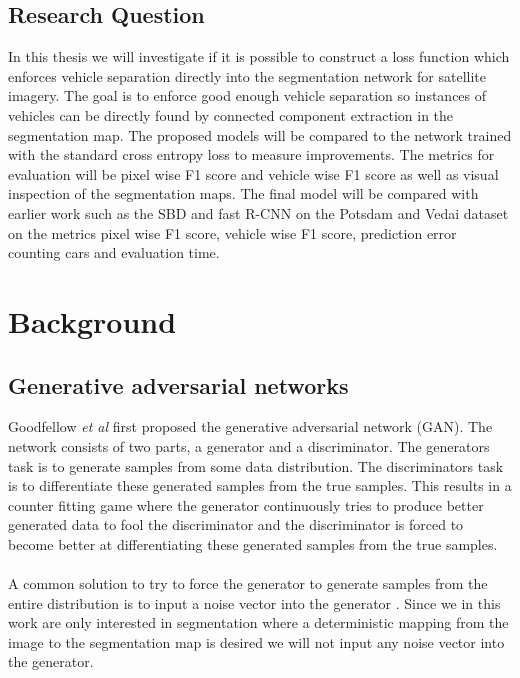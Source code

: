 \documentclass{kththesis}
\begin{document}
\section{Research Question}
In this thesis we will investigate if it is possible to construct a loss function which enforces vehicle separation directly into the segmentation network for satellite imagery. The goal is to enforce  good enough vehicle separation so instances of vehicles can be directly found by connected component extraction in the segmentation map. The proposed models will be compared to the network trained with the standard cross entropy loss to measure improvements. The metrics for evaluation will be pixel wise F1 score and vehicle wise F1 score as well as visual inspection of the segmentation maps. The final model will be compared with earlier work such as the SBD and fast R-CNN on the Potsdam and Vedai dataset on the metrics pixel wise F1 score, vehicle wise F1 score, prediction error counting cars and evaluation time.
\chapter{Background}
\section{Generative adversarial networks}
Goodfellow \textit{et al} \parencite{goodfellow_nips_2016} first proposed the generative adversarial network (GAN). The network consists of two parts, a generator and a discriminator. The generators task is to generate samples from some data distribution. The discriminators task is to differentiate these generated samples from the true samples. This results in a counter fitting game where the generator continuously tries to produce better generated data to fool the discriminator and the discriminator is forced to become better at differentiating these generated samples from the true samples.\\
\\
A common solution to try to force the generator to generate samples from the entire distribution is to input a noise vector into the generator \parencite{reed_generative_2016}. Since we in this work are only interested in segmentation where a deterministic mapping from the image to the segmentation map is desired we will not input any  noise vector into the generator.
\end{document}
